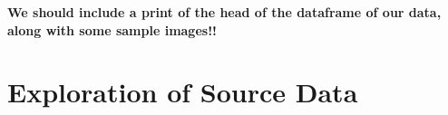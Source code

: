 \documentclass[
  letterpaper,
  DIV=11,
  numbers=noendperiod]{scrreprt}
\begin{document}
\textbf{We should include a print of the head of the dataframe of our
data, along with some sample images!!}

\hypertarget{exploration-of-source-data}{%
\section{Exploration of Source Data}\label{exploration-of-source-data}}

\begin{figure}

\begin{minipage}[t]{0.33\linewidth}

{\centering 


}

\end{minipage}%
%
\begin{minipage}[t]{0.33\linewidth}

{\centering 

\raisebox{-\height}{

}}
\end{minipage}
\end{figure}
\end{document}
